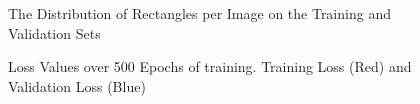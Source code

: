 \documentclass{article}
\begin{document}
\begin{figure}
\centering
{}
\qquad
{}
\caption{The Distribution of Rectangles per Image on the Training and Validation Sets}
\label{fig:recdist}
\end{figure}

\begin{figure}
\centering
{}
\qquad
{}
\caption{Loss Values over 500 Epochs of training. Training Loss (Red) and Validation Loss (Blue)}
\label{fig:rgrasp_loss}
\end{figure}
\end{document}

